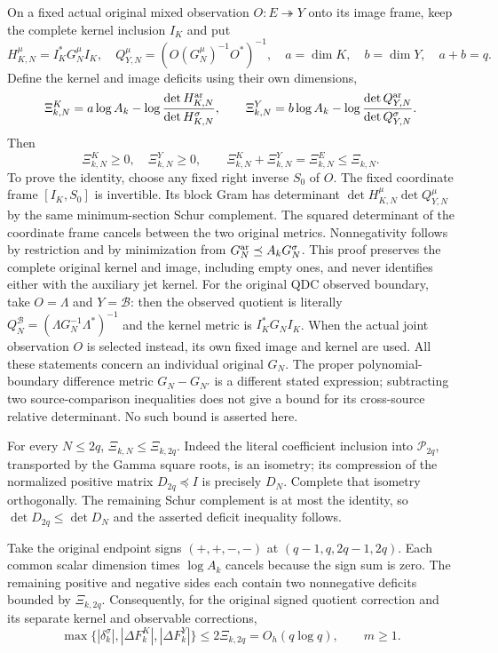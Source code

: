 On a fixed actual original mixed observation $O:E\twoheadrightarrow Y$
onto its image frame, keep the complete kernel inclusion $I_K$ and put
\[
 H_{K,N}^\mu=I_K^*G_N^\mu I_K,\quad
 Q_{Y,N}^\mu=(O(G_N^\mu)^{-1}O^*)^{-1},\quad a=\dim K,\quad b=\dim Y,
 \quad a+b=q.
\]
Define the kernel and image deficits using their own dimensions,
\[
 \Xi^K_{k,N}=a\log A_k-\log\frac{\det H_{K,N}^{\rm ar}}
                                      {\det H_{K,N}^\sigma},\qquad
 \Xi^Y_{k,N}=b\log A_k-\log\frac{\det Q_{Y,N}^{\rm ar}}
                                      {\det Q_{Y,N}^\sigma}.
\]
Then
\begin{equation}\tag{GTM19}
 \Xi^K_{k,N}\ge0,\quad\Xi^Y_{k,N}\ge0,\qquad
 \Xi^K_{k,N}+\Xi^Y_{k,N}=\Xi^E_{k,N}\le\Xi_{k,N}.
\end{equation}
To prove the identity, choose any fixed right inverse $S_0$ of $O$.
The fixed coordinate frame $[I_K,S_0]$ is invertible.  Its block Gram
has determinant $\det H_{K,N}^\mu\det Q_{Y,N}^\mu$ by the
same minimum-section Schur complement.  The squared determinant of
the coordinate frame cancels between the two original metrics.
Nonnegativity follows by restriction and by minimization from
$G_N^{\rm ar}\preceq A_kG_N^\sigma$.
This proof preserves the complete original kernel and image, including
empty ones, and never identifies either with the auxiliary jet kernel.
For the original QDC observed boundary, take $O=\Lambda$ and
$Y=\mathcal B$: then the observed quotient is literally
$Q_N^{\mathcal B}=(\Lambda G_N^{-1}\Lambda^*)^{-1}$ and the
kernel metric is $I_K^*G_NI_K$.  When the actual joint observation
$O$ is selected instead, its own fixed image and kernel are used.
All these statements concern an individual original $G_N$.
The proper polynomial-boundary difference metric
$G_N-G_{N'}$ is a different stated expression; subtracting two
source-comparison inequalities does not give a bound for its
cross-source relative determinant.  No such bound is asserted here.

For every $N\le2q$, $\Xi_{k,N}\le\Xi_{k,2q}$.
Indeed the literal coefficient inclusion into $\mathcal P_{2q}$,
transported by the Gamma square roots, is an isometry; its compression
of the normalized positive matrix $D_{2q}\preceq I$ is precisely
$D_N$.  Complete that isometry orthogonally.  The remaining Schur
complement is at most the identity, so
$\det D_{2q}\le\det D_N$ and the asserted deficit inequality follows.

Take the original endpoint signs $(+,+,-,-)$ at
$(q-1,q,2q-1,2q)$.  Each common scalar dimension times
$\log A_k$ cancels because the sign sum is zero.  The remaining
positive and negative sides each contain two nonnegative deficits
bounded by $\Xi_{k,2q}$.  Consequently, for the original signed
quotient correction and its separate kernel and observable corrections,
\begin{equation}\tag{GTM20}
 \boxed{\max\{|\delta_k^\sigma|,|\Delta F_k^K|,|\Delta F_k^Y|\}
 \le2\Xi_{k,2q}=O_h(q\log q),\qquad m\ge1.}
\end{equation}

